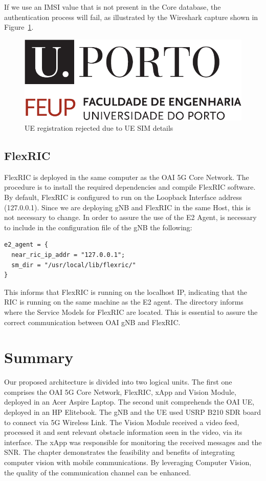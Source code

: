If we use an IMSI value that is not present in the Core database, the authentication process will fail, as illustrated by the Wireshark capture shown in Figure~\ref{fig:UE_failure}.

\begin{figure}[H]
    \centering
    \includegraphics[width=0.7\linewidth]{figures/uporto-feup}
    \caption{UE registration rejected due to UE SIM details}
    \label{fig:UE_failure}
\end{figure}

\subsection{FlexRIC}\label{subsec:flexric}
FlexRIC is deployed in the same computer as the OAI 5G Core Network.
The procedure is to install the required dependencies and compile FlexRIC software.
By default, FlexRIC is configured to run on the Loopback Interface address (127.0.0.1).
Since we are deploying gNB and FlexRIC in the same Host, this is not necessary to change.
In order to assure the use of the E2 Agent, is necessary to include in the configuration file of the gNB the following:

\begin{verbatim}
e2_agent = {
  near_ric_ip_addr = "127.0.0.1";
  sm_dir = "/usr/local/lib/flexric/"
}
\end{verbatim}

This informs that FlexRIC is running on the localhost IP, indicating that the RIC is running on the same machine as the E2 agent.
The directory informs where the Service Models for FlexRIC are located.
This is essential to assure the correct communication between OAI gNB and FlexRIC\@.



\section{Summary}\label{sec:summary}
Our proposed architecture is divided into two logical units.
The first one comprises the OAI 5G Core Network, FlexRIC, xApp and Vision Module, deployed in an Acer Aspire Laptop.
The second unit comprehends the OAI UE, deployed in an HP Elitebook.
The gNB and the UE used USRP B210 SDR board to connect via 5G Wireless Link.
The Vision Module received a video feed, processed it and sent relevant obstacle information seen in the video, via its interface.
The xApp was responsible for monitoring the received messages and the SNR.
The chapter demonstrates the feasibility and benefits of integrating computer vision with mobile communications.
By leveraging Computer Vision, the quality of the communication channel can be enhanced.






